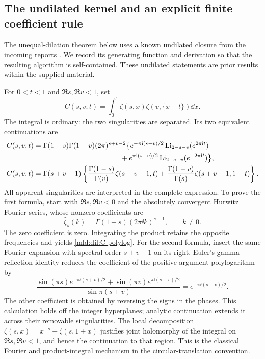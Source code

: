\subsection{The undilated kernel and an explicit finite coefficient rule}
\label{mld:dil:undilated-algorithm}

The unequal-dilation theorem below uses a known undilated closure from
the incoming reports \cite{IncomingClosure,IncomingShifted}. We record its
generating function and derivation so that the resulting algorithm is
self-contained. These undilated statements are prior results within the
supplied material.

For $0<t<1$ and $\Re s,\Re v<1$, set
\[
 C(s,v;t)=\int_0^1\zeta(s,x)\zeta(v,\{x+t\})\dd x.
\]
The integral is ordinary: the two singularities are separated. Its two
equivalent continuations are
\begin{align}
 C(s,v;t)={}&\Gamma(1-s)\Gamma(1-v)(2\pi)^{s+v-2}
 \bigl\{e^{-\pi\ii(s-v)/2}\Li_{2-s-v}(e^{2\pi\ii t})\notag\\
 &\hspace{38mm}+e^{\pi\ii(s-v)/2}\Li_{2-s-v}(e^{-2\pi\ii t})\bigr\},
 \label{mld:dil:C-polylog}\\
 C(s,v;t)={}&\Gamma(s+v-1)
 \left\{\frac{\Gamma(1-s)}{\Gamma(v)}\zeta(s+v-1,t)
       +\frac{\Gamma(1-v)}{\Gamma(s)}\zeta(s+v-1,1-t)\right\}.
 \label{mld:dil:C-hurwitz}
\end{align}
All apparent singularities are interpreted in the complete expression.
To prove the first formula, start with $\Re s,\Re v<0$ and the absolutely
convergent Hurwitz Fourier series, whose nonzero coefficients are
\[
 \widehat\zeta_s(k)=\Gamma(1-s)(2\pi\ii k)^{s-1},\qquad k\ne0.
\]
The zero coefficient is zero. Integrating the product retains the
opposite frequencies and yields \eqref{mld:dil:C-polylog}. For the second
formula, insert the same Fourier expansion with spectral order $s+v-1$
on its right. Euler's gamma reflection identity reduces the coefficient
of the positive-argument polylogarithm by
\[
 \frac{\sin(\pi s)e^{-\pi\ii(s+v)/2}
       +\sin(\pi v)e^{\pi\ii(s+v)/2}}{\sin\pi(s+v)}
       =e^{-\pi\ii(s-v)/2}.
\]
The other coefficient is obtained by reversing the signs in the phases.
This calculation holds off the integer hyperplanes; analytic continuation
extends it across their removable singularities. The local decomposition
$\zeta(s,x)=x^{-s}+\zeta(s,1+x)$ justifies joint holomorphy of the
integral on $\Re s,\Re v<1$, and hence the continuation to that region.
This is the classical Fourier and product-integral mechanism
\cite{DLMFhurwitz,EspinosaMoll} in the circular-translation convention.


